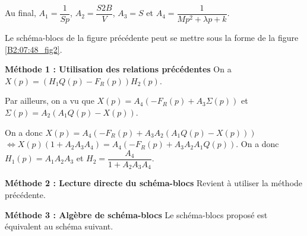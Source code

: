 Au final,  $A_1=\dfrac{1}{Sp}$,  $A_2 = \dfrac{S2B}{V} $,  $A_3 = S$  et $A_4 = \dfrac{1}{Mp^2  +\lambda p  + k}$.

\else
\fi

\ifprof
\else

Le schéma-blocs de la figure précédente peut se mettre sous la forme de la figure \ref{B2:07:48_fig2}. 

\footnotesize
\begin{marginfigure}
\caption{Schéma-bloc \label{B2:07:48_fig2}}
\end{marginfigure}
\normalsize

\fi

\ifprof

\textbf{Méthode 1 : Utilisation des relations précédentes}
On a $X(p)=\left(H_1Q(p)-F_R(p)\right)H_2(p)$. 

Par ailleurs, on a vu que $X(p)=A_4\left(-F_R(p)+A_3\Sigma(p)\right) $ et $\Sigma(p)=A_2\left(A_1Q(p)-X(p)\right)$. 

On a donc $X(p)=A_4\left(-F_R(p)+A_3  A_2\left(A_1Q(p)-X(p)\right)\right) $ $ \Leftrightarrow X(p)\left(1+A_2A_3A_4 \right)=A_4\left(-F_R(p)+A_3  A_2A_1Q(p)\right) $. On a donc 
$H_1(p)=A_1  A_2A_3$ et $H_2 = \dfrac{A_4}{1+ A_2A_3A_4 }$.

\textbf{Méthode 2 : Lecture directe du schéma-blocs}
Revient à utiliser la méthode précédente. 

\textbf{Méthode 3 : Algèbre de schéma-blocs}
Le schéma-blocs proposé est équivalent au schéma suivant. 

